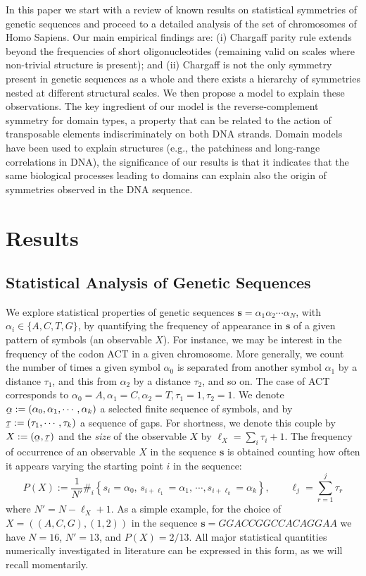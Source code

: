 \documentclass[fleqn,10pt]{wlscirep}
\begin{document}
In this  paper  we start with a review of known results on statistical symmetries of genetic sequences and proceed to a detailed analysis of the set of chromosomes of Homo Sapiens. Our main empirical findings are: (i) Chargaff parity rule extends beyond the frequencies of short oligonucleotides (remaining valid on scales where non-trivial structure is present); and (ii) Chargaff is not the only symmetry  present in  genetic sequences as a whole and there exists a hierarchy of symmetries nested at different structural scales. We then propose a model to explain these observations. The key ingredient of our model is the reverse-complement symmetry for domain types, a property that can be related to the action of transposable elements indiscriminately on both DNA strands. Domain models have been used to explain  structures (e.g., the patchiness and long-range correlations in DNA), the significance of our results is that it indicates that the same biological processes leading to domains can explain also the origin of symmetries observed in the DNA sequence.



\section*{Results}
\subsection*{Statistical Analysis of Genetic Sequences}
We  explore  statistical properties of genetic  sequences  $\textbf{s}= \alpha_1 \alpha_2 \cdots  \alpha_{N}$,  with $\alpha_i \in \{A,C,T,G\}$, by quantifying the frequency of appearance in  $\textbf{s}$  of a given pattern of symbols (an observable $X$). For instance, we may be interest in the frequency of the codon ACT in a given chromosome. More generally, we count the number of times a given symbol $\alpha_0$ is separated from another symbol $\alpha_1$ by a distance $\tau_1$, and this from $\alpha_2 $ by a distance $\tau_2$, and so on. The case of ACT corresponds to $\alpha_0=A, \alpha_1=C, \alpha_2=T, \tau_1=1, \tau_2=1$.
We denote  $\underaccent{\bar}{\alpha}:= (\alpha_0,  \alpha_1, \cdots, \alpha_k)$ a selected finite sequence of symbols, and by $\underaccent{\bar}{\tau} := (\tau_1, \cdots, \tau_k )$ a sequence of gaps. For shortness, we denote this  couple  by $X := ( \underaccent{\bar}{\alpha} , \underaccent{\bar}{\tau} )$ and the {\it size} of the observable $X$ by $\ell_X=\sum_{i} \tau_i+1$.
The frequency of occurrence of an observable $X$  in the sequence $\textbf{s}$ is obtained counting how often it appears varying the starting point $i$ in the sequence:
%
\begin{equation}\label{def.statisticsX}
P(X):=\frac1{N'}  \#_i  \left\{ s_i=\alpha_0, \,  s_{i+\ell_1}=\alpha_1,\,  \cdots , 
s_{i+\ell_k}=\alpha_k   \right\},\qquad \ell_j=\sum_{r=1}^{j}\tau_r
\end{equation}
where $N'=N-\ell_X+1$. As a simple example, for the choice of   $X=\left( (A,C,G), (1,2) \right)$  in the sequence $\textbf{s}=GGACCGGCCACAGGAA$ we have $N=16$, $N'=13$, and $P(X)=2/13$.
All major statistical quantities numerically investigated in literature can be expressed in this form, as we will recall momentarily.  
\end{document}
